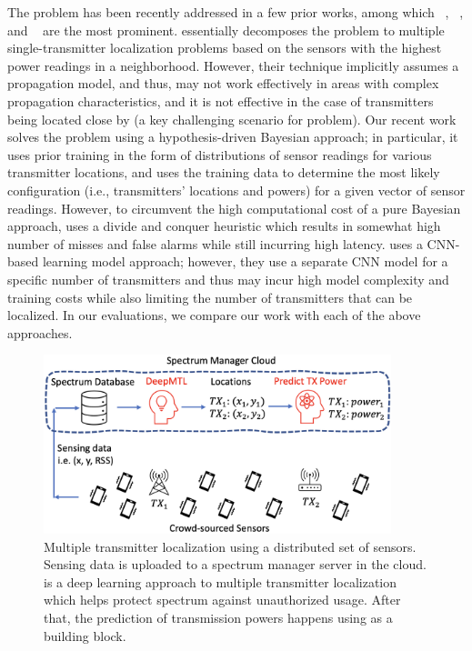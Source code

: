 The \mtl problem has been recently addressed in a few prior works, among which \splot~\cite{mobicom17-splot}, \map~\cite{ipsn20-mtl}, and 
\deeptx~\cite{icccn20-deeptxfinder} are the most 
prominent. \splot essentially decomposes the \mtl
problem to multiple single-transmitter localization problems based on
the sensors with the highest power readings in a
neighborhood. However, their technique implicitly assumes a propagation model, and
thus, may not work effectively in areas with complex propagation
characteristics, and it is not effective in the case of transmitters
being located close by (a key challenging scenario for \mtl problem).
Our recent work \map solves the \mtl problem using a 
hypothesis-driven Bayesian approach; in particular, it uses prior training in the form of distributions
of sensor readings for various transmitter locations, and uses the training data to determine
the most likely configuration (i.e., transmitters' locations and powers) for a 
given vector of sensor readings. 
However, to circumvent the high computational cost of a pure Bayesian approach,
\map uses a divide and conquer heuristic which results in somewhat 
high number of misses and false alarms while still incurring high
latency. 
\deeptx uses a CNN-based learning model approach; 
however, they use a separate CNN model for a specific number of transmitters
and thus may incur high model complexity and training costs while also limiting the number 
of transmitters that can be localized.
In our evaluations, we compare our work with each of the above approaches.

\begin{figure}[t]
\centering
\includegraphics[width=0.9\textwidth]{chapters/wowmom-pmc/figures/architecture.png}
\caption{Multiple transmitter localization using a distributed set of sensors. Sensing data is uploaded to a spectrum manager server in the cloud. \our is a deep learning approach to multiple transmitter localization which helps protect 
spectrum against unauthorized usage. After that, the prediction of transmission powers happens using \our as a building block.}
\label{fig:illustration}
\end{figure}

